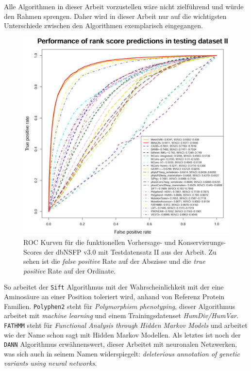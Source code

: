 Alle Algorithmen in dieser Arbeit vorzustellen wäre nicht zielführend und würde den Rahmen sprengen. Daher wird in dieser Arbeit nur auf die wichtigsten Unterschiede zwischen den Algorithmen exemplarisch eingegangen. 

\begin{figure}
\centering
\includegraphics[width=.95\textwidth]{images/compared_prediction_scores.png}
\caption{\ac{ROC} Kurven für die funktionellen Vorhersage- und Konservierungs- Scores der dbNSFP v3.0 mit Testdatensatz II aus der Arbeit\cite{Liu.2016}. Zu sehen ist die \emph{false positive} Rate auf der Abszisse und die \emph{true positive} Rate auf der Ordinate.}
\label{fig:comp_scores}
\end{figure}

So arbeitet der \texttt{Sift}\cite{Vaser.2016} Algorithmus mit der Wahrscheinlichkeit mit der eine Aminosäure an einer Position toleriert wird, anhand von Referenz Protein Familien.
\texttt{Polyphen2}\cite{Adzhubei.2013} steht für \emph{Polymorphism phenotyping}, dieser Algorithmus arbeitet mit \emph{machine learning} und einem Trainingsdatenset \emph{HumDiv/HumVar}.
\texttt{FATHMM}\cite{Shihab.2013} steht für \emph{Functional Analysis through Hidden Markov Models} und arbeitet wie der Name schon sagt mit Hidden Markov Modellen.
Als letztes ist noch der \texttt{DANN} \cite{Quang.2015} Algorithmus erwähnenswert, dieser Arbeitet mit neuronalen Netzwerken, was sich auch in seinem Namen widerspiegelt: \emph{deleterious annotation of genetic variants using neural networks}.

